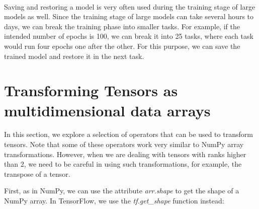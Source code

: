 \documentclass[11pt]{article}
\begin{document}
    \begin{center}
    \end{center}
    { \hspace*{\fill} \\}
    
    Saving and restoring a model is very often used during the training
stage of large models as well. Since the training stage of large models
can take several hours to days, we can break the training phase into
smaller tasks. For example, if the intended number of epochs is 100, we
can break it into 25 tasks, where each task would run four epochs one
after the other. For this purpose, we can save the trained model and
restore it in the next task.

    \section{Transforming Tensors as multidimensional data
arrays}\label{transforming-tensors-as-multidimensional-data-arrays}

    In this section, we explore a selection of operators that can be used to
transform tensors. Note that some of these operators work very similar
to NumPy array transformations. However, when we are dealing with
tensors with ranks higher than 2, we need to be careful in using such
transformations, for example, the transpose of a tensor.

First, as in NumPy, we can use the attribute \emph{arr.shape} to get the
shape of a NumPy array. In TensorFlow, we use the \emph{tf.get\_shape}
function instead:
\end{document}
